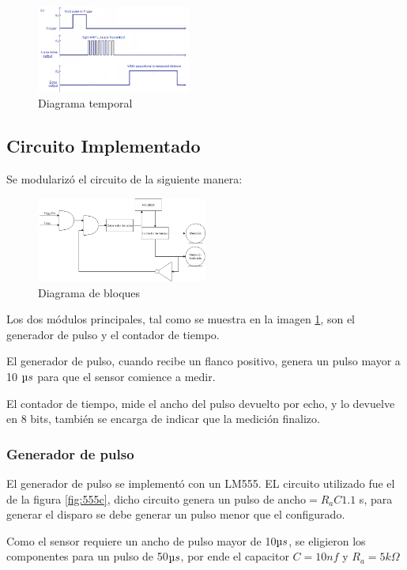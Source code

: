 \documentclass[../../e3_tp2_main.tex]{subfiles}
\begin{document}
\begin{figure}[H]	
	\centering
	\includegraphics[width=0.45\textwidth]{imagenes/sensor_t.png}
	\caption{Diagrama temporal}
\end{figure}

\subsection{Circuito Implementado}

Se modularizó el circuito de la siguiente manera:
\begin{figure}[H]	
	\centering
	\includegraphics[width=0.5\textwidth]{imagenes/dBloques.png}
	\caption{Diagrama de bloques}\label{fig:dBloques}
\end{figure}
Los dos módulos principales, tal como se muestra en la imagen \ref{fig:dBloques}, son el generador de pulso y el contador de tiempo.
\par El generador de pulso, cuando recibe un flanco positivo, genera un pulso mayor a 10 $\micro s$ para que el sensor comience a medir.
\par El contador de tiempo, mide el ancho del pulso devuelto por echo, y lo devuelve en 8 bits, también se encarga de indicar que la medición finalizo.

\subsubsection{Generador de pulso}
El generador de pulso se implementó con un LM555. EL circuito utilizado fue el de la figura \ref{fig:555c}, dicho circuito genera un pulso de ancho$= R_a C 1.1$ s, para generar el disparo se debe generar un pulso menor que el configurado.
\par Como el sensor requiere un ancho de pulso mayor de 10$\micro s$, se eligieron los componentes para un pulso de 50$\micro s$, por ende el capacitor $C=10nf$ y $R_a=5k \Omega$
\end{document}
